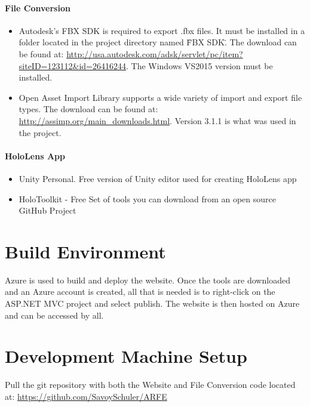 \paragraph{File Conversion}
\begin{itemize}
    \item Autodesk's FBX SDK is required to export .fbx files.  It must be installed in a folder located in the project directory named \"FBX SDK\".  The download can be found at: 
    \url{http://usa.autodesk.com/adsk/servlet/pc/item?siteID=123112&id=26416244}.
    The Windows VS2015 version must be installed.

    \item Open Asset Import Library supports a wide variety of import and export file types.  The download can be found at: \url{http://assimp.org/main_downloads.html}.  Version 3.1.1 is what was used in the project.         
\end{itemize}

\paragraph{HoloLens App}
\begin{itemize}
    \item Unity Personal. Free version of Unity editor used for creating HoloLens app

    \item HoloToolkit - Free Set of tools you can download from an open source GitHub Project
\end{itemize}

\section{Build  Environment}
Azure is used to build and deploy the website. Once the tools are downloaded and an Azure account is created, 
all that is needed is to right-click on the ASP.NET MVC project and select publish. The website is then hosted on Azure and
can be accessed by all.
\section{Development Machine Setup}

Pull the git repository with both the Website and File Conversion code located at: \url{https://github.com/SavoySchuler/ARFE}


